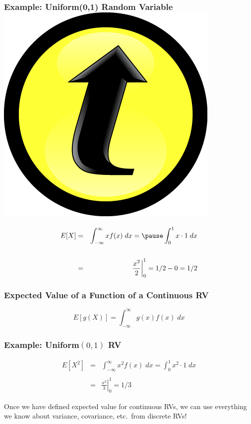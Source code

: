 \documentclass[handout]{beamer}
\begin{document}
\begin{frame}
\frametitle{Example: Uniform(0,1) Random Variable \hfill \includegraphics[scale = 0.05]{./images/clicker}}
\begin{eqnarray*}
	E[X] &=&  \int_{-\infty}^\infty x f(x) \; dx =\pause  \int_{0}^1 x \cdot 1 \; dx \\ \\
		&=&  \left.\frac{x^2}{2}\right|_0^1 = 1/2  - 0 = 1/2
\end{eqnarray*}
\end{frame}
\begin{frame}
\frametitle{Expected Value of a Function of a Continuous RV}
	$$\boxed{E[g(X)] = \int_{-\infty}^\infty g(x) f(x) \; dx}$$
\end{frame}



\begin{frame}
\frametitle{Example: Uniform$(0,1)$ RV}
	\begin{eqnarray*}
	E[X^2] &=& \int_{-\infty}^\infty x^2 f(x) \; dx = \int_0^1 x^2 \cdot 1 \; dx\\ \\
		&=& \left. \frac{x^3}{3}\right|_0^1 = 1/3
	\end{eqnarray*}
\end{frame}



\begin{frame}
Once we have defined expected value for continuous RVs, we can use everything we know about variance, covariance, etc.\ from discrete RVs!
\end{frame}
\end{document}
